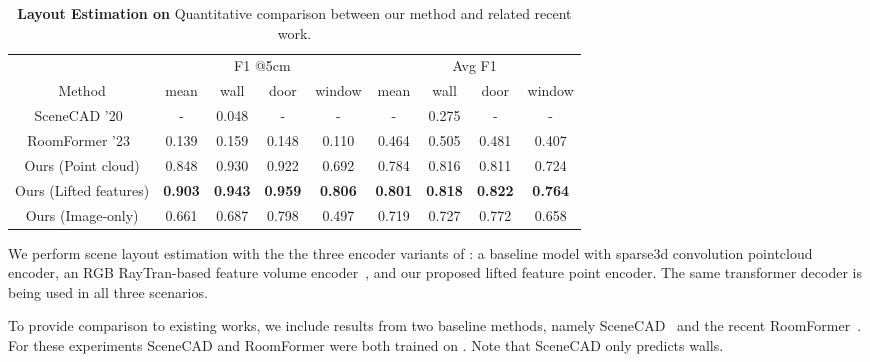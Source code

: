 \begin{table}[t]
    \centering
    \caption{\textbf{Layout Estimation on \DatasetName{}} Quantitative comparison between our method and related recent work. 
    }
    \begin{tabular}{c|cccc|cccc}
         & \multicolumn{4}{c|}{F1 @5cm} & \multicolumn{4}{c}{Avg F1}\\
        Method & mean & wall & door & window & mean & wall & door & window \\
        \hline
        \hline
        SceneCAD '20~\cite{avetisyan2020scenecad}           & - & 0.048   & -  & -    & - & 0.275 & - & - \\
        RoomFormer '23~\cite{yue2023connecting}             & 0.139 & 0.159 & 0.148 & 0.110     & 0.464 & 0.505 & 0.481 & 0.407 \\
        \hline
        Ours (Point cloud)     & 0.848 & 0.930 & 0.922 & 0.692     & 0.784 & 0.816 & 0.811 & 0.724 \\
        Ours (Lifted features)  & \textbf{0.903} & \textbf{0.943} & \textbf{0.959} & \textbf{0.806}     & \textbf{0.801} & \textbf{0.818} & \textbf{0.822} & \textbf{0.764}\\
        Ours (Image-only)       & 0.661 & 0.687 & 0.798 & 0.497     & 0.719 & 0.727 & 0.772 & 0.658 \\

    \end{tabular}
    \label{tab:main_results_table}
\end{table}



We perform scene layout estimation with the the three encoder variants of \METHOD: a baseline model with sparse3d convolution pointcloud encoder, an RGB RayTran-based feature volume encoder~\cite{tyszkiewicz2022raytran}, and our proposed lifted feature point encoder. The same transformer decoder is being used in all three scenarios. 

To provide comparison to existing works, we include results from two baseline methods, namely SceneCAD~\cite{avetisyan2020scenecad} and the recent  RoomFormer~\cite{yue2023connecting}. For these experiments SceneCAD and RoomFormer were both trained on \DatasetName. 
Note that SceneCAD only predicts walls.

